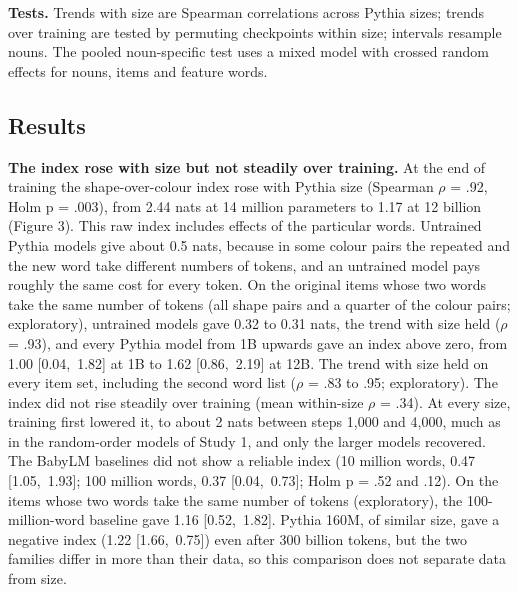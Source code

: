 \textbf{Tests.} Trends with size are Spearman correlations across Pythia sizes; trends over training are tested by permuting checkpoints within size; intervals resample nouns. The pooled noun-specific test uses a mixed model with crossed random effects for nouns, items and feature words.

\subsection{Results}
\textbf{The index rose with size but not steadily over training.} At the end of training the shape-over-colour index rose with Pythia size (Spearman $\rho$ = .92, Holm p = .003), from \textminus{}2.44 nats at 14 million parameters to 1.17 at 12 billion (Figure 3). This raw index includes effects of the particular words. Untrained Pythia models give about 0.5 nats, because in some colour pairs the repeated and the new word take different numbers of tokens, and an untrained model pays roughly the same cost for every token. On the original items whose two words take the same number of tokens (all shape pairs and a quarter of the colour pairs; exploratory), untrained models gave \textminus{}0.32 to 0.31 nats, the trend with size held ($\rho$ = .93), and every Pythia model from 1B upwards gave an index above zero, from 1.00 [0.04,~1.82] at 1B to 1.62 [0.86,~2.19] at 12B. The trend with size held on every item set, including the second word list ($\rho$ = .83 to .95; exploratory). The index did not rise steadily over training (mean within-size $\rho$ = \textminus{}.34). At every size, training first lowered it, to about \textminus{}2 nats between steps 1,000 and 4,000, much as in the random-order models of Study 1, and only the larger models recovered. The BabyLM baselines did not show a reliable index (10 million words, 0.47 [\textminus{}1.05,~1.93]; 100 million words, 0.37 [\textminus{}0.04,~0.73]; Holm p = .52 and .12). On the items whose two words take the same number of tokens (exploratory), the 100-million-word baseline gave 1.16 [0.52,~1.82]. Pythia 160M, of similar size, gave a negative index (\textminus{}1.22 [\textminus{}1.66,~\textminus{}0.75]) even after 300 billion tokens, but the two families differ in more than their data, so this comparison does not separate data from size.

